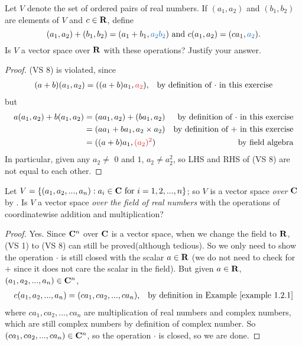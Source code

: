 \begin{exercise} \label{exercise 1.2.13}
Let \(V\) denote the set of ordered pairs of real numbers.
If \((a_1, a_2)\) and \((b_1, b_2)\) are elements of \(V\) and \(c \in \mathbf{R}\), define
\[
    (a_1, a_2) + (b_1, b_2) = (a_1 + b_1, \BLUE{a_2 b_2}) \text{ and } c(a_1, a_2) = (c a_1, \BLUE{a_2}).
\]
Is \(V\) a vector space over \(\mathbf{R}\) with these operations?
Justify your answer.
\end{exercise}

\begin{proof}
 (VS 8) is violated, since
\begin{align*}
    (a + b)(a_1, a_2) & = ((a + b)a_1, \RED{a_2}), & \text{by definition of \(\cdot\) in this exercise}
\end{align*}
but
\begin{align*}
    a(a_1, a_2) + b(a_1, a_2) & = (a a_1, a_2) + (b a_1, a_2) & \text{by definition of \(\cdot\) in this exercise} \\
                              & = (a a_1 + b a_1, a_2 \X a_2) & \text{by definition of \(+\) in this exercise} \\
                              & = ((a + b)a_1, \RED{(a_2)^2}) & \text{by field algebra}
\end{align*}
In particular, given any \(a_2 \ne\) \(0\) and \(1\), \(a_2 \ne a_2^2\), so LHS and RHS of (VS 8) are not equal to each other.
\end{proof}

\begin{exercise} \label{exercise 1.2.14}
Let \(V = \{(a_1, a_2, ..., a_n): a_i \in \mathbf{C} \text{ for } i = 1, 2, ..., n\}\);
so \(V\) is a vector space \emph{over} \(\mathbf{C}\) by .
Is \(V\) a vector space \emph{over the field of real numbers} with the operations of coordinatewise addition and multiplication?
\end{exercise}

\begin{proof}
Yes.
Since \(\mathbf{C}^n\) over \(\mathbf{C}\) is a vector space, when we change the field to \(\mathbf{R}\),  (VS 1) to (VS 8) can still be proved(although tedious).
So we only need to show the operation \(\cdot\) is still closed with the scalar \(a \in \mathbf{R}\)
(we do not need to check for \(+\) since it does not care the scalar in the field).
But given \(a \in \mathbf{R}\), \((a_1, a_2, ..., a_n) \in \mathbf{C}^n\),
\begin{align*}
    c (a_1, a_2, ..., a_n) & = (c a_1, c a_2, ..., c a_n), & \text{by definition in \EXAMPLE{1.2.1}}
\end{align*}
where \(c a_1, c a_2, ..., c a_n\) are multiplication of real numbers and complex numbers, which are still complex numbers by definition of complex number.
So \((c a_1, c a_2, ..., c a_n) \in \mathbf{C}^n\), so the operation \(\cdot\) is closed, so we are done.
\end{proof}

